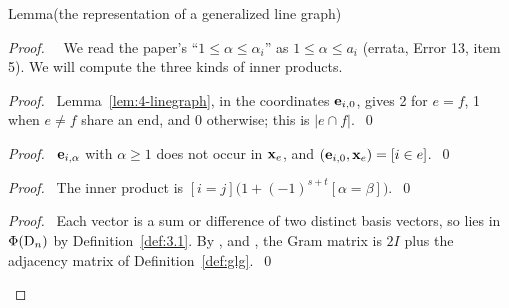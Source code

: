 \begin{namedresult}{Lemma}{(the representation of a generalized line graph)}\label{lem:4-glgrep}
\end{namedresult}
\begin{proof}
 \pfsketch\ \repair\ We read the paper's ``$1\le\alpha\le\alpha_i$'' as $1\le\alpha\le a_i$
 (errata, Error 13, item 5). We will compute the three kinds of inner products.
 \begin{proof}\pf\ Lemma~\ref{lem:4-linegraph}, in the coordinates ${\mathbf e}_{i,0}$, gives 2 for
  $e=f$, 1 when $e\ne f$ share an end, and 0 otherwise; this is $|e\cap f|$.~\qed\end{proof}
 \begin{proof}\pf\ ${\mathbf e}_{i,\alpha}$ with $\alpha\ge1$ does not occur in ${\mathbf x}_e$, and
  $({\mathbf e}_{i,0},{\mathbf x}_e)=[i\in e]$.~\qed\end{proof}
 \begin{proof}\pf\ The inner product is
  $[i=j]\bigl(1+(-1)^{s+t}[\alpha=\beta]\bigr)$.~\qed\end{proof}
 \qedstep
 \begin{proof}\pf\ Each vector is a sum or difference of two distinct basis vectors, so lies in
  $\Phi(\mathrm{D}_n)$ by Definition~\ref{def:3.1}. By ,  and
  , the Gram matrix is $2I$ plus the adjacency matrix of
  Definition~\ref{def:glg}.~\qed\end{proof}
\end{proof}


